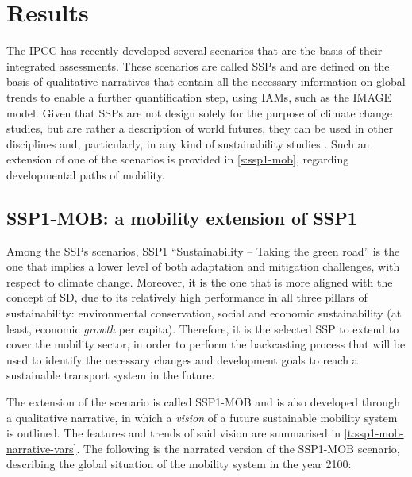 \chapter{Results}
\label{c:results}

The \gls{IPCC} has recently developed several scenarios that are the basis of their integrated assessments. These scenarios are called \glspl{SSP} and are defined on the basis of qualitative narratives that contain all the necessary information on global trends to enable a further quantification step, using \glspl{IAM}, such as the IMAGE model. Given that \glspl{SSP} are not design solely for the purpose of climate change studies, but are rather a description of world futures, they can be used in other disciplines and, particularly, in any kind of sustainability studies . Such an extension of one of the scenarios is provided in \autoref{s:ssp1-mob}, regarding developmental paths of mobility.

\section{SSP1-MOB: a mobility extension of SSP1}
\label{s:results:ssp1-mob}

Among the \glspl{SSP} scenarios, SSP1 ``Sustainability -- Taking the green road'' is the one that implies a lower level of both adaptation and mitigation challenges, with respect to climate change. Moreover, it is the one that is more aligned with the concept of \gls{SD}, due to its relatively high performance in all three pillars of sustainability: environmental conservation, social and economic sustainability (at least, economic \textit{growth} per capita). Therefore, it is the selected \gls{SSP} to extend to cover the mobility sector, in order to perform the backcasting process that will be used to identify the necessary changes and development goals to reach a sustainable transport system in the future.

The extension of the scenario is called \gls{SSP1-MOB} and is also developed through a qualitative narrative, in which a \textit{vision} of a future sustainable mobility system is outlined. The features and trends of said vision are summarised in \autoref{t:ssp1-mob-narrative-vars}. The following is the narrated version of the \gls{SSP1-MOB} scenario, describing the global situation of the mobility system in the year 2100:


